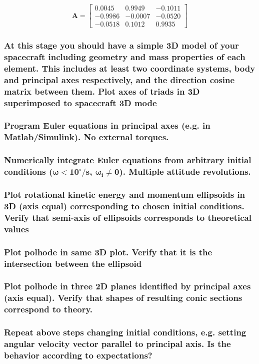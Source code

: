 \begin{equation*}
    \boldsymbol{A} = \begin{bmatrix}
            0.0045  &  0.9949 &  -0.1011 \\
            -0.9986  & -0.0007  & -0.0520 \\
            -0.0518  &  0.1012  &  0.9935
    \end{bmatrix}
\end{equation*}

\subsubsection{At this stage you should have a simple 3D model of your spacecraft including geometry and mass properties of each element. This includes at least two coordinate systems, body and principal axes respectively, and the direction cosine matrix between them. Plot axes of triads in 3D superimposed to spacecraft 3D mode}

\subsubsection{Program Euler equations in principal axes (e.g. in Matlab/Simulink). No external torques.}

\subsubsection{Numerically integrate Euler equations from arbitrary initial conditions ($\boldsymbol{\omega < 10^{\circ}/s}$, $\boldsymbol{\omega_i \neq 0}$). Multiple attitude revolutions.}

\subsubsection{Plot rotational kinetic energy and momentum ellipsoids in 3D (axis equal) corresponding to chosen initial conditions. Verify that semi-axis of ellipsoids corresponds to theoretical values}

\subsubsection{Plot polhode in same 3D plot. Verify that it is the intersection between the ellipsoid}

\subsubsection{Plot polhode in three 2D planes identified by principal axes (axis equal). Verify that shapes of resulting conic sections correspond to theory.}

\subsubsection{Repeat above steps changing initial conditions, e.g. setting angular velocity vector parallel to principal axis. Is the behavior according to expectations?}